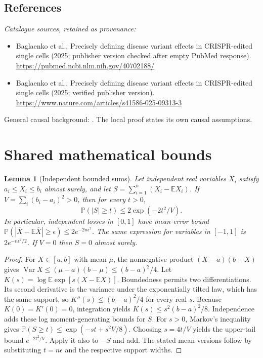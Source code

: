 \documentclass[11pt]{article}
\newcommand{\E}{\mathbb E}
\newcommand{\Prob}{\mathbb P}
\DeclareMathOperator{\Var}{Var}
\providecommand{\E}{\mathbb E}
\providecommand{\Prob}{\mathbb P}
\providecommand{\Var}{\operatorname{Var}}
\newtheorem{sharedlemma}{Lemma}[section]
\begin{document}
\subsection{References}
\noindent\emph{Catalogue sources, retained as provenance:}
\begin{itemize}
\item Baglaenko et al., Precisely defining disease variant effects in CRISPR-edited single cells (2025; publisher version checked after empty PubMed response). \url{https://pubmed.ncbi.nlm.nih.gov/40702188/}
\item Baglaenko et al., Precisely defining disease variant effects in CRISPR-edited single cells (2025; verified publisher version). \url{https://www.nature.com/articles/s41586-025-09313-3}
\end{itemize}
\noindent General causal background: \cite{pearl}. The local proof states its own causal assumptions.
\clearpage


\appendix
\section{Shared mathematical bounds}\label{app:bounds}
\begin{sharedlemma}[Independent bounded sums]\label{lem:bounded}
Let independent real variables $X_i$ satisfy $a_i\leq X_i\leq b_i$ almost surely,
and let $S=\sum_{i=1}^n(X_i-\E X_i)$. If
$V=\sum_i(b_i-a_i)^2>0$, then for every $t>0$,
\[
 \Prob(|S|\geq t)\leq 2\exp(-2t^2/V).
\]
In particular, independent losses in $[0,1]$ have mean-error bound
$\Prob(|\overline X-\E\overline X|\geq\epsilon)
\leq2e^{-2n\epsilon^2}$. The same expression for variables in $[-1,1]$
is $2e^{-n\epsilon^2/2}$. If $V=0$ then $S=0$ almost surely.
\end{sharedlemma}
\begin{proof}
For $X\in[a,b]$ with mean $\mu$, the nonnegative product
$(X-a)(b-X)$ gives
$\Var X\leq(\mu-a)(b-\mu)\leq(b-a)^2/4$.
Let $K(s)=\log\E\exp[s(X-\E X)]$.
Boundedness permits two differentiations. Its second derivative is the variance
under the exponentially tilted law, which has the same support, so
$K''(s)\leq(b-a)^2/4$ for every real $s$.
Because $K(0)=K'(0)=0$, integration yields
$K(s)\leq s^2(b-a)^2/8$.
Independence adds these log moment-generating bounds for $S$.
For $s>0$, Markov's inequality gives
$\Prob(S\geq t)\leq\exp(-st+s^2V/8)$.
Choosing $s=4t/V$ yields the upper-tail bound $e^{-2t^2/V}$.
Apply it also to $-S$ and add. The stated mean versions follow by substituting
$t=n\epsilon$ and the respective support widths.
\end{proof}
\end{document}
